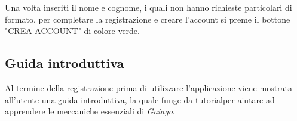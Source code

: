 Una volta inseriti il nome e cognome, i quali non hanno richieste particolari di formato, per completare la registrazione e creare l'account si preme il bottone "CREA ACCOUNT" di colore verde.

\subsection{Guida introduttiva}
Al termine della registrazione prima di utilizzare l'applicazione viene mostrata all'utente una guida introduttiva, la quale funge da tutorial\glosp per aiutare ad apprendere le meccaniche essenziali di \textit{Gaiago}.


